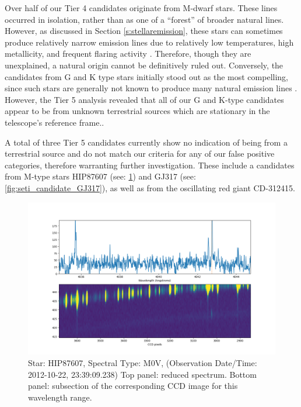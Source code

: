 \documentclass[twocolumn]{aastex701}
\begin{document}
Over half of our Tier 4 candidates originate from M-dwarf stars. These lines occurred in isolation, rather than as one of a ``forest'' of broader natural lines. However, as discussed in Section \ref{s:stellaremission}, these stars can sometimes produce relatively narrow emission lines due to relatively low temperatures, high metallicity, and frequent flaring activity \citep{Marcy_2021}. Therefore, though they are unexplained, a natural origin cannot be definitively ruled out. Conversely, the candidates from G and K type stars initially stood out as the most compelling, since such stars are generally not known to produce many natural emission lines \citep{stellar_emission_linesJ}. However, the Tier 5 analysis revealed that all of our G and K-type candidates appear to be from unknown terrestrial sources which are stationary in the telescope's reference frame..

A total of three Tier 5 candidates currently show no indication of being from a terrestrial source and do not match our criteria for any of our false positive categories, therefore warranting further investigation. These include a candidates from M-type stars HIP87607 (see: \ref{fig:seti_candidate_HIP87607}) and GJ317 (see: \ref{fig:seti_candidate_GJ317}), as well as from the oscillating red giant CD-312415.

\begin{figure}
    \centering  \includegraphics[width=\textwidth]{20_ADP.2014-09-26T16_52_17.823_zoom (1).png}
    \caption{Star: HIP87607, Spectral Type: M0V, (Observation Date/Time: 2012-10-22, 23:39:09.238) Top panel: reduced spectrum. Bottom panel: subsection of the corresponding CCD image for this wavelength range.}
    \label{fig:seti_candidate_HIP87607}
\end{figure}
\end{document}
